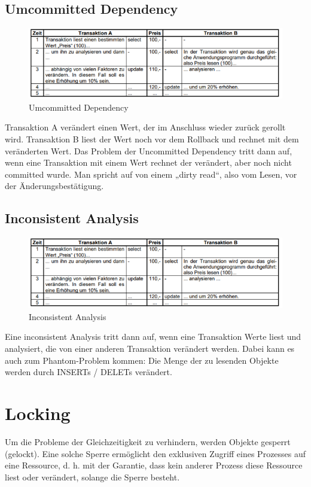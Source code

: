 \subsection{Umcommitted Dependency}
\begin{figure}[H]
\centering
    \includegraphics[width=.75\textwidth]{Content/images/gleichzeitigkeit/lostupdate.png}
    \caption{Umcommitted Dependency}
\end{figure}
\noindent
Transaktion A verändert einen Wert, der im Anschluss wieder zurück gerollt wird. Transaktion B liest der Wert noch vor dem Rollback und rechnet mit dem veränderten Wert. 
Das Problem der Uncommitted Dependency tritt dann auf, wenn eine Transaktion mit einem Wert rechnet der verändert, aber noch nicht committed wurde. Man spricht auf von einem „dirty read“, also vom Lesen, vor der Änderungsbestätigung. 

\subsection{Inconsistent Analysis}
\begin{figure}[H]
\centering
    \includegraphics[width=.75\textwidth]{Content/images/gleichzeitigkeit/lostupdate.png}
    \caption{Inconsistent Analysis}
\end{figure}
\noindent
Eine inconsistent Analysis tritt dann auf, wenn eine Transaktion Werte liest und analysiert, die von einer anderen Transaktion verändert werden. Dabei kann es auch zum Phantom-Problem kommen: Die Menge der zu lesenden Objekte werden durch INSERTs / DELETs verändert.

\section{Locking}
Um die Probleme der Gleichzeitigkeit zu verhindern, werden Objekte gesperrt (gelockt). Eine solche Sperre ermöglicht den exklusiven Zugriff eines Prozesses auf eine Ressource, d. h. mit der Garantie, dass kein anderer Prozess diese Ressource liest oder verändert, solange die Sperre besteht. 

